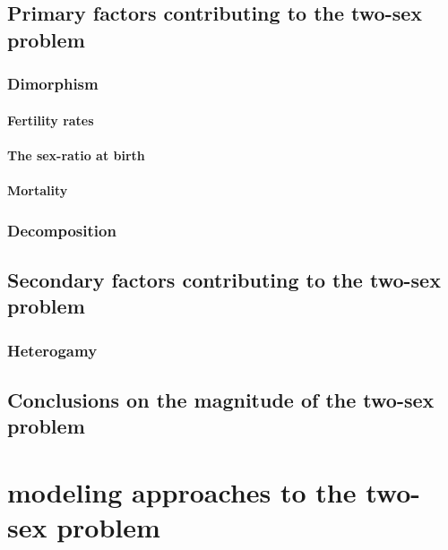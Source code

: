   \section{Primary factors contributing to the two-sex problem}
    \subsection{Dimorphism}
      
      \subsubsection{Fertility rates}
        
      \subsubsection{The sex-ratio at birth}
        
      \subsubsection{Mortality}
        
    \subsection{Decomposition}
       
  \section{Secondary factors contributing to the two-sex problem}
      
    \subsection{Heterogamy}
       
  \section{Conclusions on the magnitude of the two-sex problem}
      
  \chapter{modeling approaches to the two-sex problem}
    

